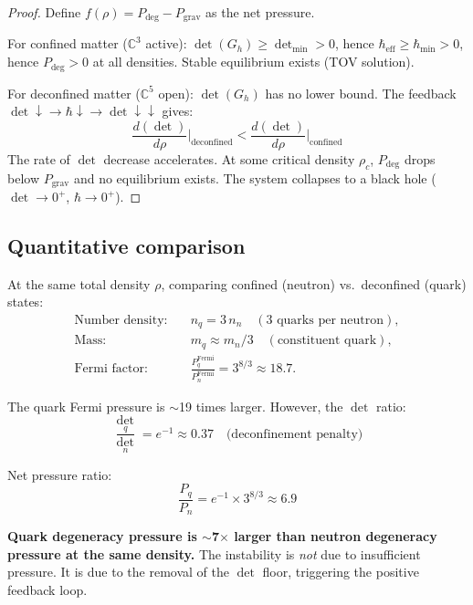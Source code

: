 \documentclass[12pt]{article}
\theoremstyle{definition}
\theoremstyle{remark}
\begin{document}
\begin{proof}
Define $f(\rho) = P_\text{deg} - P_\text{grav}$ as the net pressure.

For confined matter ($\mathbb{C}^3$ active):
$\det(G_h) \geq \det_\text{min} > 0$, hence $\hbar_\text{eff} \geq \hbar_\text{min} > 0$, hence $P_\text{deg} > 0$ at all densities. Stable equilibrium exists (TOV solution).

For deconfined matter ($\mathbb{C}^5$ open):
$\det(G_h)$ has no lower bound. The feedback $\det \downarrow \to \hbar \downarrow \to \det \downarrow\downarrow$ gives:
\begin{equation}
\frac{d(\det)}{d\rho}\bigg|_\text{deconfined} < \frac{d(\det)}{d\rho}\bigg|_\text{confined}
\end{equation}
The rate of $\det$ decrease accelerates. At some critical density $\rho_c$, $P_\text{deg}$ drops below $P_\text{grav}$ and no equilibrium exists. The system collapses to a black hole ($\det \to 0^+$, $\hbar \to 0^+$).
\end{proof}

\subsection{Quantitative comparison}

At the same total density $\rho$, comparing confined (neutron) vs.\ deconfined (quark) states:
\begin{align}
\text{Number density:} &\quad n_q = 3\,n_n \quad (\text{3 quarks per neutron}), \\
\text{Mass:} &\quad m_q \approx m_n/3 \quad (\text{constituent quark}), \\
\text{Fermi factor:} &\quad \frac{P_q^\text{Fermi}}{P_n^\text{Fermi}} = 3^{8/3} \approx 18.7.
\end{align}

The quark Fermi pressure is $\sim$19 times larger. However, the $\det$ ratio:
\begin{equation}
\frac{\det_q}{\det_n} = e^{-1} \approx 0.37 \quad \text{(deconfinement penalty)}
\end{equation}

Net pressure ratio:
\begin{equation}
\frac{P_q}{P_n} = e^{-1} \times 3^{8/3} \approx 6.9
\end{equation}

\textbf{Quark degeneracy pressure is $\sim$7$\times$ larger than neutron degeneracy pressure at the same density.} The instability is \emph{not} due to insufficient pressure. It is due to the removal of the $\det$ floor, triggering the positive feedback loop.
\end{document}
